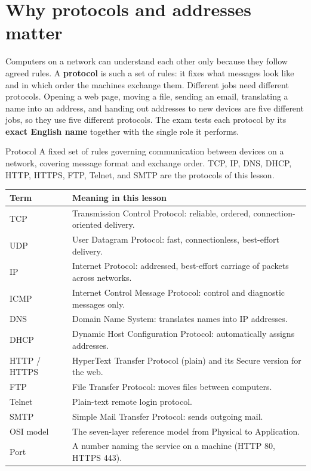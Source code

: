 \section{Why protocols and addresses matter}
Computers on a network can understand each other only because they follow
agreed rules. A \textbf{protocol} is such a set of rules: it fixes what
messages look like and in which order the machines exchange them. Different
jobs need different protocols. Opening a web page, moving a file, sending an
email, translating a name into an address, and handing out addresses to new
devices are five different jobs, so they use five different protocols. The
exam tests each protocol by its \textbf{exact English name} together with the
single role it performs.

\begin{definitionbox}{Protocol}
A fixed set of rules governing communication between devices on a network,
covering message format and exchange order. TCP, IP, DNS, DHCP, HTTP, HTTPS,
FTP, Telnet, and SMTP are the protocols of this lesson.
\end{definitionbox}

\begin{center}
\begin{tabular}{p{}p{}}
\toprule
\textbf{Term} & \textbf{Meaning in this lesson} \\
\midrule
TCP & Transmission Control Protocol: reliable, ordered, connection-oriented delivery. \\
UDP & User Datagram Protocol: fast, connectionless, best-effort delivery. \\
IP & Internet Protocol: addressed, best-effort carriage of packets across networks. \\
ICMP & Internet Control Message Protocol: control and diagnostic messages only. \\
DNS & Domain Name System: translates names into IP addresses. \\
DHCP & Dynamic Host Configuration Protocol: automatically assigns addresses. \\
HTTP / HTTPS & HyperText Transfer Protocol (plain) and its Secure version for the web. \\
FTP & File Transfer Protocol: moves files between computers. \\
Telnet & Plain-text remote login protocol. \\
SMTP & Simple Mail Transfer Protocol: sends outgoing mail. \\
OSI model & The seven-layer reference model from Physical to Application. \\
Port & A number naming the service on a machine (HTTP 80, HTTPS 443). \\
\bottomrule
\end{tabular}
\end{center}

